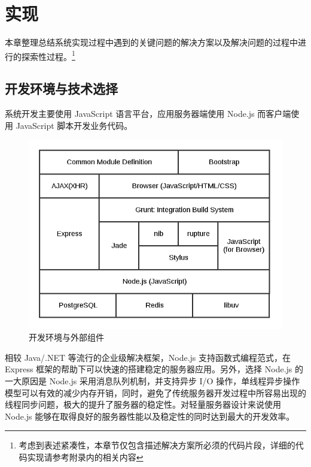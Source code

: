 \chapter{实现}

本章整理总结系统实现过程中遇到的关键问题的解决方案以及解决问题的过程中进行的探索性过程。\footnote{考虑到表述紧凑性，本章节仅包含描述解决方案所必须的代码片段，详细的代码实现请参考附录内的相关内容}

\section{开发环境与技术选择}

系统开发主要使用 JavaScript 语言平台，应用服务器端使用 Node.js 而客户端使用 JavaScript 脚本开发业务代码。

\begin{figure}[!h]
  \begin{center}
    \includegraphics[width=\textwidth]{figures/diagram-tech-stack.png}
    \caption{开发环境与外部组件\label{TechStack}}
  \end{center}
\end{figure}

相较 Java/.NET 等流行的企业级解决框架，Node.js 支持函数式编程范式，在 Express 框架的帮助下可以快速的搭建稳定的服务器应用。另外，选择 Node.js 的一大原因是 Node.js 采用消息队列机制，并支持异步 I/O 操作，单线程异步操作模型可以有效的减少内存开销，同时，避免了传统服务器开发过程中所容易出现的线程同步问题，极大的提升了服务器的稳定性。对轻量服务器设计来说使用 Node.js 能够在取得良好的服务器性能以及稳定性的同时达到最大的开发效率。

